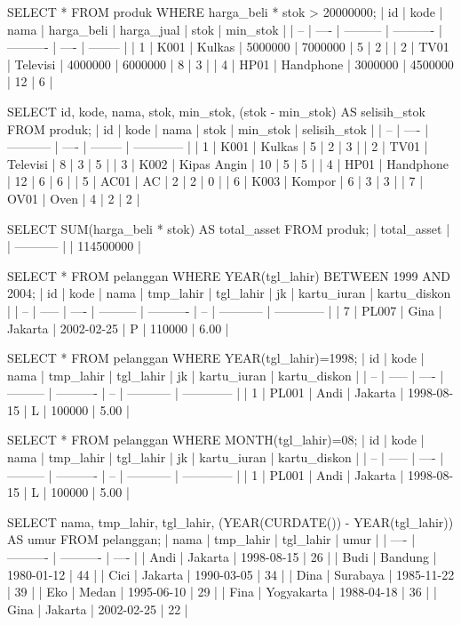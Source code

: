 SELECT * FROM produk WHERE harga_beli * stok > 20000000;
| id | kode | nama      | harga_beli | harga_jual | stok | min_stok |
| -- | ---- | --------- | ---------- | ---------- | ---- | -------- |
| 1  | K001 | Kulkas    | 5000000    | 7000000    | 5    | 2        |
| 2  | TV01 | Televisi  | 4000000    | 6000000    | 8    | 3        |
| 4  | HP01 | Handphone | 3000000    | 4500000    | 12   | 6        |

SELECT id, kode, nama, stok, min_stok, (stok - min_stok) AS selisih_stok FROM produk;
| id | kode | nama        | stok | min_stok | selisih_stok |
| -- | ---- | ----------- | ---- | -------- | ------------ |
| 1  | K001 | Kulkas      | 5    | 2        | 3            |
| 2  | TV01 | Televisi    | 8    | 3        | 5            |
| 3  | K002 | Kipas Angin | 10   | 5        | 5            |
| 4  | HP01 | Handphone   | 12   | 6        | 6            |
| 5  | AC01 | AC          | 2    | 2        | 0            |
| 6  | K003 | Kompor      | 6    | 3        | 3            |
| 7  | OV01 | Oven        | 4    | 2        | 2            |

SELECT SUM(harga_beli * stok) AS total_asset FROM produk;
| total_asset |
| ----------- |
| 114500000   |

SELECT * FROM pelanggan WHERE YEAR(tgl_lahir) BETWEEN 1999 AND 2004;
| id | kode  | nama | tmp_lahir | tgl_lahir  | jk | kartu_iuran | kartu_diskon |
| -- | ----- | ---- | --------- | ---------- | -- | ----------- | ------------ |
| 7  | PL007 | Gina | Jakarta   | 2002-02-25 | P  | 110000      | 6.00         |

SELECT * FROM pelanggan WHERE YEAR(tgl_lahir)=1998;
| id | kode  | nama | tmp_lahir | tgl_lahir  | jk | kartu_iuran | kartu_diskon |
| -- | ----- | ---- | --------- | ---------- | -- | ----------- | ------------ |
| 1  | PL001 | Andi | Jakarta   | 1998-08-15 | L  | 100000      | 5.00         |

SELECT * FROM pelanggan WHERE MONTH(tgl_lahir)=08;
| id | kode  | nama | tmp_lahir | tgl_lahir  | jk | kartu_iuran | kartu_diskon |
| -- | ----- | ---- | --------- | ---------- | -- | ----------- | ------------ |
| 1  | PL001 | Andi | Jakarta   | 1998-08-15 | L  | 100000      | 5.00         |

SELECT nama, tmp_lahir, tgl_lahir, (YEAR(CURDATE()) - YEAR(tgl_lahir)) AS umur FROM pelanggan;
| nama | tmp_lahir  | tgl_lahir  | umur |
| ---- | ---------- | ---------- | ---- |
| Andi | Jakarta    | 1998-08-15 | 26   |
| Budi | Bandung    | 1980-01-12 | 44   |
| Cici | Jakarta    | 1990-03-05 | 34   |
| Dina | Surabaya   | 1985-11-22 | 39   |
| Eko  | Medan      | 1995-06-10 | 29   |
| Fina | Yogyakarta | 1988-04-18 | 36   |
| Gina | Jakarta    | 2002-02-25 | 22   |